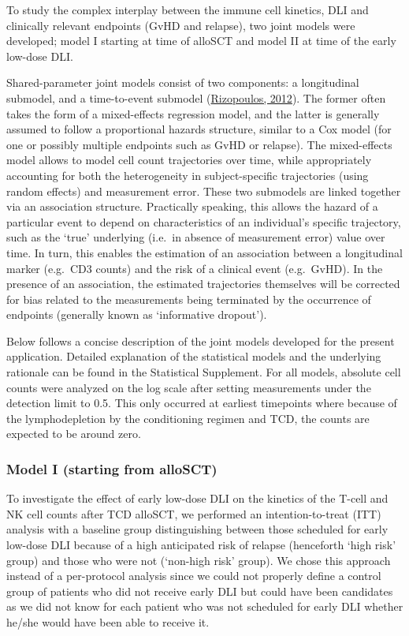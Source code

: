 \documentclass[
  letterpaper,
  DIV=11,
  numbers=noendperiod]{scrreprt}
\begin{document}
To study the complex interplay between the immune cell kinetics, DLI and
clinically relevant endpoints (GvHD and relapse), two joint models were
developed; model I starting at time of alloSCT and model II at time of
the early low-dose DLI.

Shared-parameter joint models consist of two components: a longitudinal
submodel, and a time-to-event submodel
(\protect\hyperlink{ref-rizopoulosJointModelsLongitudinal2012}{Rizopoulos,
2012}). The former often takes the form of a mixed-effects regression
model, and the latter is generally assumed to follow a proportional
hazards structure, similar to a Cox model (for one or possibly multiple
endpoints such as GvHD or relapse). The mixed-effects model allows to
model cell count trajectories over time, while appropriately accounting
for both the heterogeneity in subject-specific trajectories (using
random effects) and measurement error. These two submodels are linked
together via an association structure. Practically speaking, this allows
the hazard of a particular event to depend on characteristics of an
individual's specific trajectory, such as the `true' underlying (i.e.~in
absence of measurement error) value over time. In turn, this enables the
estimation of an association between a longitudinal marker (e.g.~CD3
counts) and the risk of a clinical event (e.g.~GvHD). In the presence of
an association, the estimated trajectories themselves will be corrected
for bias related to the measurements being terminated by the occurrence
of endpoints (generally known as `informative dropout').

Below follows a concise description of the joint models developed for
the present application. Detailed explanation of the statistical models
and the underlying rationale can be found in the Statistical Supplement.
For all models, absolute cell counts were analyzed on the log scale
after setting measurements under the detection limit to 0.5. This only
occurred at earliest timepoints where because of the lymphodepletion by
the conditioning regimen and TCD, the counts are expected to be around
zero.

\hypertarget{model-i-starting-from-allosct}{%
\subsubsection{Model I (starting from
alloSCT)}\label{model-i-starting-from-allosct}}

To investigate the effect of early low-dose DLI on the kinetics of the
T-cell and NK cell counts after TCD alloSCT, we performed an
intention-to-treat (ITT) analysis with a baseline group distinguishing
between those scheduled for early low-dose DLI because of a high
anticipated risk of relapse (henceforth `high risk' group) and those who
were not (`non-high risk' group). We chose this approach instead of a
per-protocol analysis since we could not properly define a control group
of patients who did not receive early DLI but could have been candidates
as we did not know for each patient who was not scheduled for early DLI
whether he/she would have been able to receive it.
\end{document}
